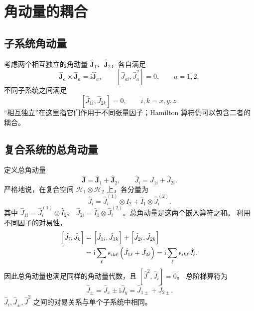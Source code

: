 \section{角动量的耦合}
\subsection{子系统角动量}
考虑两个相互独立的角动量 $\hat{\bm J}_1$、$\hat{\bm J}_2$，各自满足
\begin{equation}
\hat{\bm J}_a\times\hat{\bm J}_a=\mathrm{i}\hat{\bm J}_a,\qquad
\left[\hat J_{ai},\hat J_a^2\right]=0,\qquad a=1,2,
\end{equation}
不同子系统之间满足
\begin{equation}
\left[\hat J_{1i},\hat J_{2k}\right]=0,\qquad i,k=x,y,z.
\end{equation}
“相互独立”在这里指它们作用于不同张量因子；Hamilton 算符仍可以包含二者的耦合。

\subsection{复合系统的总角动量}
定义总角动量
\begin{equation}
\boxed{\hat{\bm J}=\hat{\bm J}_1+\hat{\bm J}_2,}
\qquad\hat J_i=\hat J_{1i}+\hat J_{2i}.
\end{equation}
严格地说，在复合空间 $\mathcal H_1\otimes\mathcal H_2$ 上，各分量为
\begin{equation}
\boxed{\hat J_i=\hat J_i^{\left(1\right)}\otimes\hat I_2
+\hat I_1\otimes\hat J_i^{\left(2\right)}.}
\label{eq:coupled-angular-tensor-sum}
\end{equation}
其中 $\hat J_{1i}=\hat J_i^{\left(1\right)}\otimes\hat I_2$、
$\hat J_{2i}=\hat I_1\otimes\hat J_i^{\left(2\right)}$。总角动量是这两个嵌入算符之和。
利用不同因子的对易性，
\begin{align}
\left[\hat J_i,\hat J_k\right]
&=\left[\hat J_{1i},\hat J_{1k}\right]+\left[\hat J_{2i},\hat J_{2k}\right]\notag\\
&=\mathrm{i}\sum_\ell\epsilon_{ik\ell}\left(\hat J_{1\ell}+\hat J_{2\ell}\right)
=\mathrm{i}\sum_\ell\epsilon_{ik\ell}\hat J_\ell.
\end{align}
因此总角动量也满足同样的角动量代数，且 $\left[\hat J^2,\hat J_i\right]=0$。
总阶梯算符为
\begin{equation}
\hat J_\pm=\hat J_x\pm\mathrm{i}\hat J_y
=\hat J_{1\pm}+\hat J_{2\pm}.
\end{equation}
$\hat J_i,\hat J_\pm,\hat J^2$ 之间的对易关系与单个子系统中相同。

